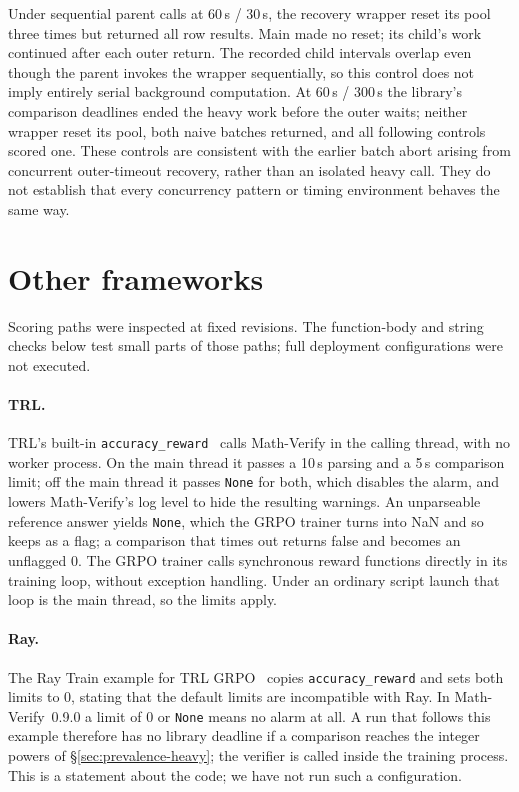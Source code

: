 \documentclass[10pt,a4paper]{article}
\newcommand{\mv}{Math-Verify}
\begin{document}
Under sequential parent calls at 60\,s / 30\,s, the recovery wrapper reset
its pool three times but returned all row results. Main made no reset;
its child's work continued after each outer return. The recorded child
intervals overlap even though the parent invokes the wrapper sequentially,
so this control does not imply entirely serial background computation.
At 60\,s / 300\,s the library's comparison deadlines ended the heavy work
before the outer waits; neither wrapper reset its pool, both naive batches
returned, and all following controls scored one. These controls are
consistent with the earlier batch abort arising from concurrent
outer-timeout recovery, rather than an isolated heavy call. They do not
establish that every concurrency pattern or timing environment behaves
the same way.

\section{Other frameworks}
\label{sec:frameworks}
Scoring paths were inspected at fixed revisions. The function-body and
string checks below test small parts of those paths; full deployment
configurations were not executed.

\paragraph{TRL.} TRL's built-in \texttt{accuracy\_reward}~\citep{trl} calls
\mv{} in the calling thread, with no worker process. On the main thread it
passes a 10\,s parsing and a 5\,s comparison limit; off the main thread it
passes \texttt{None} for both, which disables the alarm, and lowers \mv{}'s
log level to hide the resulting warnings. An unparseable reference answer
yields \texttt{None}, which the GRPO trainer turns into NaN and so keeps as a
flag; a comparison that times out returns false and becomes an unflagged $0$.
The GRPO trainer calls synchronous reward functions directly in its training
loop, without exception handling. Under an ordinary script launch that loop
is the main thread, so the limits apply.

\paragraph{Ray.} The Ray Train example for TRL GRPO~\citep{raytrl} copies
\texttt{accuracy\_reward} and sets both limits to $0$, stating that the
default limits are incompatible with Ray. In \mv{}~0.9.0 a limit of $0$ or
\texttt{None} means no alarm at all. A run that follows this example therefore
has no library deadline if a comparison reaches the integer powers of
\S\ref{sec:prevalence-heavy}; the verifier is called inside the training
process. This is a statement about the code; we have not run such a
configuration.
\end{document}
